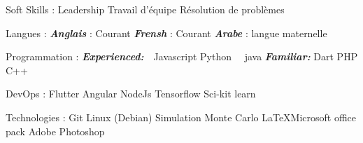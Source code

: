 

\begin{cvskills}



\cvskill
{Soft Skills :} %
{Leadership   \cpshalf 	Travail d'équipe  \cpshalf 	Résolution de problèmes} %


\cvskill
{Langues :} %
{\textbf{\emph{Anglais}} : Courant \cpshalf \textbf{\emph{Frensh}} : Courant \cpshalf \textbf{\emph{Arabe}} : langue maternelle} %




\cvskill
{Programmation :} %
{\textbf{\emph{Experienced:}}\ \ Javascript   \cpshalf Python \cpshalf  \ \ java \textbf{\emph{Familiar:}} Dart \cpshalf PHP \cpshalf C++} %


\cvskill
{DevOps :} %
{Flutter  \cpshalf  Angular  \cpshalf  NodeJs  \cpshalf  Tensorflow  \cpshalf  Sci-kit learn} %

%
%
\cvskill
{Technologies :} %
{Git  \cpshalf  Linux (Debian)  \cpshalf  Simulation Monte Carlo  \cpshalf  \LaTeX \cpshalf Microsoft office pack \cpshalf  Adobe Photoshop } %
%


\end{cvskills}
